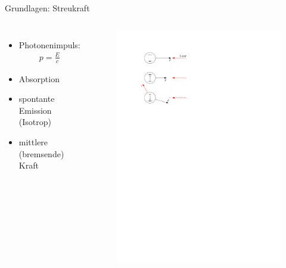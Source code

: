 \documentclass[12pt,xcolor=dvipsnames]{beamer}
\begin{document}
\begin{frame}{Grundlagen: Streukraft}
	\begin{columns}[t]
		\begin{itemize}
			\item Photonenimpuls:
			\begin{align}
			p = \frac{E}{c}
			\end{align}
			\item Absorption
			\item spontante Emission (Isotrop)
			\item mittlere (bremsende) Kraft
		\end{itemize}
		
		\begin{figure}[h]
			\centering
			\includegraphics[width=1.0\textwidth]{./figures/streukraft.pdf}
		\end{figure}
		
	\end{columns}

\end{frame}
\end{document}
